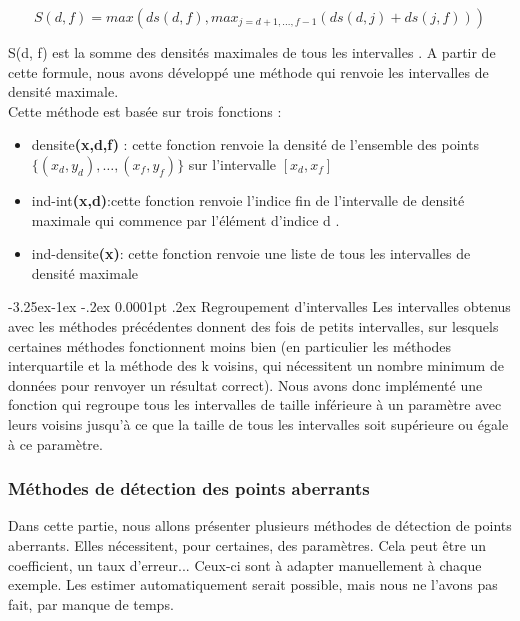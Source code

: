 \documentclass[a4paper,12pt]{article} %
\makeatletter
\renewcommand\paragraph{\@startsection{paragraph}{4}{\z@}%
                                      {-3.25ex\@plus -1ex \@minus -.2ex}%
                                      {0.0001pt \@plus .2ex}%
                                      {\normalfont\normalsize\bfseries}}
\makeatother
\begin{document}
                        \begin{flushleft}
                            \bf
                            
                        
                        $$S(d,f)= max (ds(d,f),max_{j=d+1,...,f-1}(ds(d,j)+ds(j,f)))$$
                         \end{flushleft}
                        S(d, f) est la somme des densités maximales de tous les intervalles .
                      A partir de cette formule, nous avons développé une méthode qui renvoie les intervalles de densité maximale.  \\
                        Cette méthode est basée sur trois fonctions :
                        \begin{itemize}
                        \item densite\textbf{(x,d,f)} : cette fonction renvoie la densité de l'ensemble des points $\{( x_d, y_d),…, ( x_f, y_f ) \}$ sur l’intervalle $[ x_d,x_f  ]$
                        \item ind-int\textbf{(x,d)}:cette fonction renvoie l'indice fin de l'intervalle de densité maximale qui commence par l'élément d'indice d . 
                        \item 	ind-densite\textbf{(x)}: cette fonction renvoie une liste de tous les intervalles de densité maximale
                        \end{itemize}
				
				    \paragraph{Regroupement d'intervalles}
				        Les intervalles obtenus avec les méthodes précédentes donnent des fois de petits intervalles, sur lesquels certaines méthodes fonctionnent moins bien (en particulier les méthodes interquartile et la méthode des k voisins, qui nécessitent un nombre minimum de données pour renvoyer un résultat correct). Nous avons donc implémenté une fonction qui regroupe tous les intervalles de taille inférieure à un paramètre avec leurs voisins jusqu'à ce que la taille de tous les intervalles soit supérieure ou égale à ce paramètre. 
				

				\subsubsection{Méthodes de détection des points aberrants}
    			    Dans cette partie, nous allons présenter plusieurs méthodes de détection de points aberrants. Elles nécessitent, pour certaines, des paramètres. Cela peut être un coefficient, un taux d'erreur... Ceux-ci sont à adapter manuellement à chaque exemple. Les estimer automatiquement serait possible, mais nous ne l'avons pas fait, par manque de temps.
                    
\end{document}
